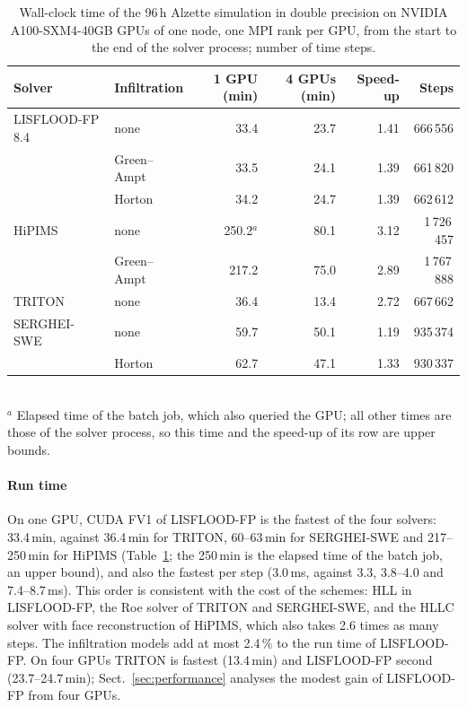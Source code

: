 \documentclass[gmd, manuscript]{copernicus}
\begin{document}
\begin{table}[t]
\caption{Wall-clock time of the 96\,h Alzette simulation in double
precision on NVIDIA A100-SXM4-40GB GPUs of one node, one MPI rank per GPU,
from the start to the end of the solver process; number of time steps.}
\label{tab:modeltimes}
\centering\small
\begin{tabular}{@{}llrrrr@{}}
\toprule
Solver & Infiltration & 1 GPU (min) & 4 GPUs (min) & Speed-up & Steps \\
\midrule
LISFLOOD-FP 8.4 & none & 33.4 & 23.7 & 1.41 & 666\,556 \\
 & Green--Ampt & 33.5 & 24.1 & 1.39 & 661\,820 \\
 & Horton & 34.2 & 24.7 & 1.39 & 662\,612 \\
HiPIMS & none & 250.2$^{a}$ & 80.1 & 3.12 & 1\,726\,457 \\
 & Green--Ampt & 217.2 & 75.0 & 2.89 & 1\,767\,888 \\
TRITON & none & 36.4 & 13.4 & 2.72 & 667\,662 \\
SERGHEI-SWE & none & 59.7 & 50.1 & 1.19 & 935\,374 \\
 & Horton & 62.7 & 47.1 & 1.33 & 930\,337 \\
\bottomrule
\end{tabular}
\\[2pt]{\footnotesize $^{a}$ Elapsed time of the batch job, which also
queried the GPU; all other times are those of the solver process, so this
time and the speed-up of its row are upper bounds.}
\end{table}

\paragraph{Run time} On one GPU, CUDA FV1 of LISFLOOD-FP is the fastest of
the four solvers: 33.4\,min, against 36.4\,min for TRITON, 60--63\,min for SERGHEI-SWE
and 217--250\,min for HiPIMS (Table~\ref{tab:modeltimes}; the 250\,min is
the elapsed time of the batch job, an upper bound), and also the
fastest per step (3.0\,ms, against 3.3, 3.8--4.0 and 7.4--8.7\,ms). This
order is consistent with the cost of the schemes: HLL in LISFLOOD-FP, the
Roe solver of TRITON and SERGHEI-SWE, and the HLLC solver with face
reconstruction of HiPIMS, which also takes 2.6 times as many steps. The
infiltration models add at most 2.4\,\% to the run time of LISFLOOD-FP. On four GPUs TRITON is fastest
(13.4\,min) and LISFLOOD-FP second (23.7--24.7\,min); Sect.~\ref{sec:performance}
analyses the modest gain of LISFLOOD-FP from four GPUs.
\end{document}
